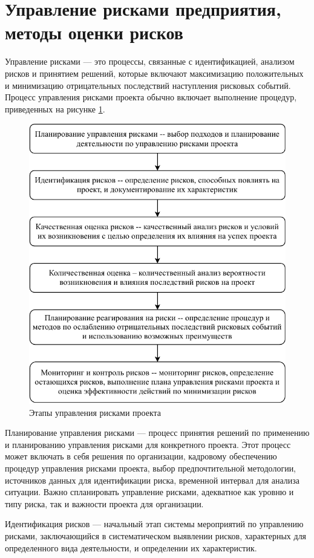 \section{Управление рисками предприятия, методы оценки рисков}

Управление рисками --- это процессы, связанные с идентификацией, анализом рисков и принятием решений, которые включают максимизацию положительных и минимизацию отрицательных последствий наступления рисковых событий. Процесс управления рисками проекта обычно включает выполнение процедур, приведенных на рисунке \ref{fig:diagram-page-2}.

\begin{figure}[!h]
	\centering
	\includegraphics[width=0.7\linewidth]{Diagram-Page-2}
	\caption{Этапы управления рисками проекта}
	\label{fig:diagram-page-2}
\end{figure}

Планирование управления рисками --- процесс принятия решений по применению и планированию управления рисками для конкретного проекта. Этот процесс
может включать в себя решения по организации, кадровому обеспечению процедур
управления рисками проекта, выбор предпочтительной методологии, источников данных
для идентификации риска, временной интервал для анализа ситуации. Важно
спланировать управление рисками, адекватное как уровню и типу риска, так и важности
проекта для организации.

Идентификация рисков --- начальный этап системы мероприятий по управлению рисками, заключающийся в систематическом выявлении рисков, характерных для определенного вида деятельности, и определении их характеристик.

